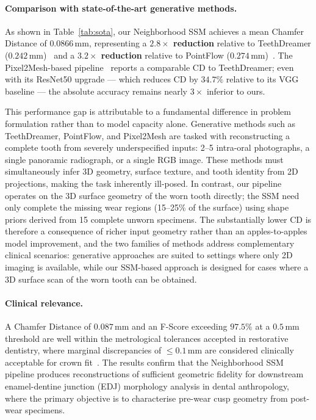 \documentclass[11pt,a4paper]{article}
\begin{document}
\paragraph{Comparison with state-of-the-art generative methods.}
As shown in Table~\ref{tab:sota}, our Neighborhood SSM achieves a
mean Chamfer Distance of $0.0866\,\text{mm}$, representing a
\textbf{$2.8\times$ reduction} relative to TeethDreamer
($0.242\,\text{mm}$)~\cite{teethDreamer2024} and a
\textbf{$3.2\times$ reduction} relative to PointFlow
($0.274\,\text{mm}$)~\cite{pointflow2025}.  The Pixel2Mesh-based
pipeline~\cite{pmcauto2025} reports a comparable CD to
TeethDreamer; even with its ResNet50 upgrade — which reduces CD by
$34.7\%$ relative to its VGG baseline — the absolute accuracy
remains nearly $3\times$ inferior to ours.

This performance gap is attributable to a fundamental difference in
problem formulation rather than to model capacity alone.  Generative
methods such as TeethDreamer, PointFlow, and Pixel2Mesh are tasked
with reconstructing a complete tooth from severely underspecified
inputs: 2--5 intra-oral photographs, a single panoramic radiograph,
or a single RGB image.  These methods must simultaneously infer
3D geometry, surface texture, and tooth identity from 2D projections,
making the task inherently ill-posed.  In contrast, our pipeline
operates on the 3D surface geometry of the worn tooth directly;
the SSM need only complete the missing wear regions (15--25\% of
the surface) using shape priors derived from 15 complete unworn
specimens.  The substantially lower CD is therefore a consequence
of richer input geometry rather than an apples-to-apples model
improvement, and the two families of methods address complementary
clinical scenarios: generative approaches are suited to settings
where only 2D imaging is available, while our SSM-based approach
is designed for cases where a 3D surface scan of the worn tooth
can be obtained.

\paragraph{Clinical relevance.}
A Chamfer Distance of $0.087\,\text{mm}$ and an F-Score exceeding
$97.5\%$ at a $0.5\,\text{mm}$ threshold are well within the
metrological tolerances accepted in restorative dentistry, where
marginal discrepancies of $\leq 0.1\,\text{mm}$ are considered
clinically acceptable for crown fit~\cite{revilla2021accuracy}.
The results confirm that the Neighborhood SSM pipeline produces
reconstructions of sufficient geometric fidelity for downstream
enamel-dentine junction (EDJ) morphology analysis in dental
anthropology, where the primary objective is to characterise
pre-wear cusp geometry from post-wear specimens.
\end{document}
